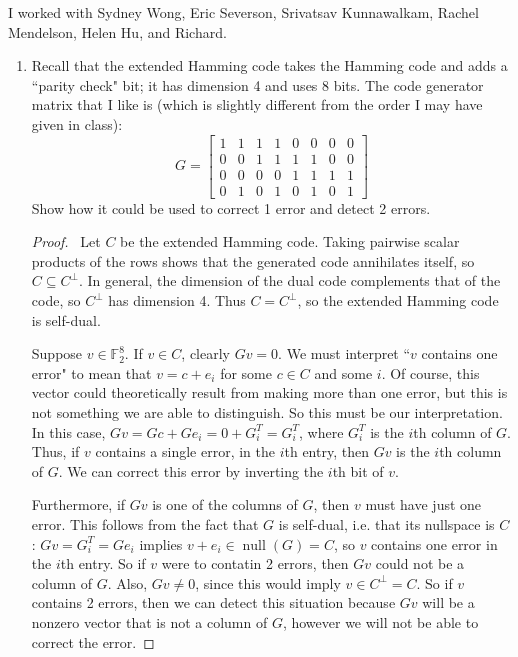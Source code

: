 \documentclass[12pt]{article}
\DeclareMathOperator{\Null}{null}
\begin{document}
\noindent I worked with Sydney Wong, Eric Severson, Srivatsav Kunnawalkam, Rachel Mendelson, Helen Hu, and Richard.

\begin{enumerate}[leftmargin=0cm,itemindent=.5cm,labelwidth=\itemindent,labelsep=0cm,align=left]

\item Recall that the extended Hamming code takes the Hamming code and adds a ``parity
check" bit; it has dimension 4 and uses 8 bits. The code generator matrix that I like
is (which is slightly different from the order I may have given in class):
$$
G =
\begin{bmatrix}
1 & 1 & 1 & 1 & 0 & 0 & 0 & 0 \\ 
0 & 0 & 1 & 1 & 1 & 1 & 0 & 0 \\ 
0 & 0 & 0 & 0 & 1 & 1 & 1 & 1 \\ 
0 & 1 & 0 & 1 & 0 & 1 & 0 & 1
\end{bmatrix} 
$$
Show how it could be used to correct 1 error and detect 2 errors.

\begin{proof}
\ Let $C$ be the extended Hamming code.  Taking pairwise scalar products of the rows shows that the generated code annihilates itself, so $C \subseteq C^{\perp}$.  In general, the dimension of the dual code complements that of the code, so $C^{\perp}$ has dimension 4.  Thus $C = C^{\perp}$, so the extended Hamming code is self-dual.

Suppose $v \in \mathbb{F}_2^8$.  If $v \in C$, clearly $Gv = 0$.  We must interpret ``$v$ contains one error" to mean that $v = c + e_i$ for some $c \in C$ and some $i$.  Of course, this vector could theoretically result from making more than one error, but this is not something we are able to distinguish.  So this must be our interpretation.  In this case, $Gv = Gc + Ge_i = 0 + G^T_i = G^T_i$, where $G^T_i$ is the $i$th column of $G$.  Thus, if $v$ contains a single error, in the $i$th entry, then $Gv$ is the $i$th column of $G$.  We can correct this error by inverting the $i$th bit of $v$.

Furthermore, if $Gv$ is one of the columns of $G$, then $v$ must have just one error.  This follows from the fact that $G$ is self-dual, i.e. that its nullspace is $C$: $Gv = G^T_i = Ge_i$ implies $v + e_i \in \Null(G) = C$, so $v$ contains one error in the $i$th entry.  So if $v$ were to contatin 2 errors, then $Gv$ could not be a column of $G$.  Also, $Gv \neq 0$, since this would imply $v \in C^{\perp} = C$.  So if $v$ contains 2 errors, then we can detect this situation because $Gv$ will be a nonzero vector that is not a column of $G$, however we will not be able to correct the error.
\end{proof}



\end{enumerate}
\end{document}
